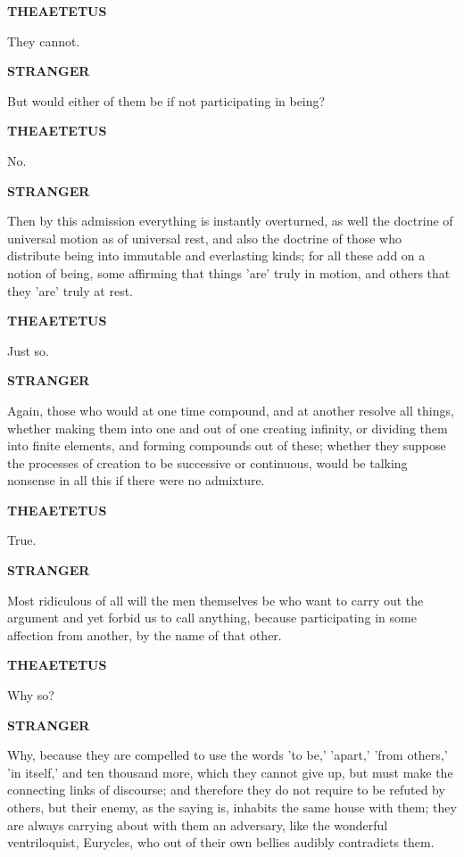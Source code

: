 \documentclass[11pt,letter]{article}
\begin{document}
\par \textbf{THEAETETUS}
\par   They cannot.

\par \textbf{STRANGER}
\par   But would either of them be if not participating in being?

\par \textbf{THEAETETUS}
\par   No.

\par \textbf{STRANGER}
\par   Then by this admission everything is instantly overturned, as well the doctrine of universal motion as of universal rest, and also the doctrine of those who distribute being into immutable and everlasting kinds; for all these add on a notion of being, some affirming that things 'are' truly in motion, and others that they 'are' truly at rest.

\par \textbf{THEAETETUS}
\par   Just so.

\par \textbf{STRANGER}
\par   Again, those who would at one time compound, and at another resolve all things, whether making them into one and out of one creating infinity, or dividing them into finite elements, and forming compounds out of these; whether they suppose the processes of creation to be successive or continuous, would be talking nonsense in all this if there were no admixture.

\par \textbf{THEAETETUS}
\par   True.

\par \textbf{STRANGER}
\par   Most ridiculous of all will the men themselves be who want to carry out the argument and yet forbid us to call anything, because participating in some affection from another, by the name of that other.

\par \textbf{THEAETETUS}
\par   Why so?

\par \textbf{STRANGER}
\par   Why, because they are compelled to use the words 'to be,' 'apart,' 'from others,' 'in itself,' and ten thousand more, which they cannot give up, but must make the connecting links of discourse; and therefore they do not require to be refuted by others, but their enemy, as the saying is, inhabits the same house with them; they are always carrying about with them an adversary, like the wonderful ventriloquist, Eurycles, who out of their own bellies audibly contradicts them.
\end{document}
